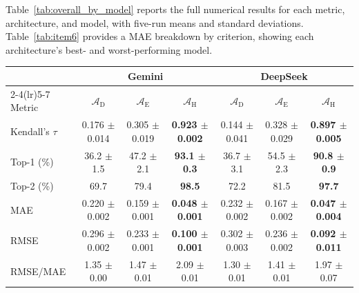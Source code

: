 \documentclass[final,3p,times]{elsarticle}
\begin{document}
Table~\ref{tab:overall_by_model} reports the full numerical results for each metric, architecture, and model, with five-run means and standard deviations. Table~\ref{tab:item6} provides a MAE breakdown by criterion, showing each architecture's best- and worst-performing model.

\begin{table}[htbp]
\begin{threeparttable}
\footnotesize
\centering
\renewcommand{\arraystretch}{1.10}
\begin{tabular}{lcccccc}
\toprule
 & \multicolumn{3}{c}{Gemini} & \multicolumn{3}{c}{DeepSeek} \\
\cmidrule(lr){2-4}\cmidrule(lr){5-7}
Metric & $\mathcal{A}_{\text{D}}$ & $\mathcal{A}_{\text{E}}$ & $\mathcal{A}_{\text{H}}$ & $\mathcal{A}_{\text{D}}$ & $\mathcal{A}_{\text{E}}$ & $\mathcal{A}_{\text{H}}$ \\
\midrule
Kendall's $\tau$ & 0.176 $\pm$ 0.014 & 0.305 $\pm$ 0.019 & \textbf{0.923 $\pm$ 0.002} & 0.144 $\pm$ 0.041 & 0.328 $\pm$ 0.029 & \textbf{0.897 $\pm$ 0.005} \\
Top-1 (\%) & 36.2 $\pm$ 1.5 & 47.2 $\pm$ 2.1 & \textbf{93.1 $\pm$ 0.3} & 36.7 $\pm$ 3.1 & 54.5 $\pm$ 2.3 & \textbf{90.8 $\pm$ 0.9} \\
Top-2 (\%) & 69.7 & 79.4 & \textbf{98.5} & 72.2 & 81.5 & \textbf{97.7} \\
MAE & 0.220 $\pm$ 0.002 & 0.159 $\pm$ 0.001 & \textbf{0.048 $\pm$ 0.001} & 0.232 $\pm$ 0.002 & 0.167 $\pm$ 0.002 & \textbf{0.047 $\pm$ 0.004} \\
RMSE & 0.296 $\pm$ 0.002 & 0.233 $\pm$ 0.001 & \textbf{0.100 $\pm$ 0.001} & 0.302 $\pm$ 0.003 & 0.236 $\pm$ 0.002 & \textbf{0.092 $\pm$ 0.011} \\
RMSE/MAE & 1.35 $\pm$ 0.00 & 1.47 $\pm$ 0.01 & 2.09 $\pm$ 0.01 & 1.30 $\pm$ 0.01 & 1.41 $\pm$ 0.01 & 1.97 $\pm$ 0.07 \\
\bottomrule
\end{tabular}

\medskip


\end{threeparttable}
\end{table}
\end{document}
